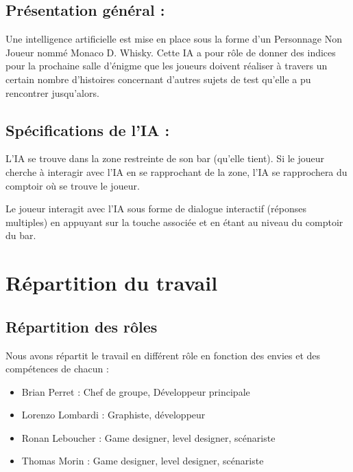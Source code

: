\documentclass[a4paper,11pt]{article}
\begin{document}
\subsection{Présentation général :}

Une intelligence artificielle est mise en place sous la 
forme d’un Personnage Non Joueur nommé Monaco D. Whisky. 
Cette IA a pour rôle de donner des indices pour la prochaine salle d’énigme que les 
joueurs doivent réaliser à travers un certain nombre d’histoires concernant d’autres sujets de 
test qu’elle a pu rencontrer jusqu’alors.


\subsection{Spécifications de l’IA :}

L’IA se trouve dans la zone restreinte de son bar (qu’elle tient). Si le joueur cherche à 
interagir avec l’IA en se rapprochant de la zone, l’IA se rapprochera du comptoir où se trouve le joueur.\newline


Le joueur interagit avec l’IA sous forme de dialogue interactif (réponses multiples) 
en appuyant sur la touche associée et en étant au niveau du comptoir du bar.


\section{Répartition du travail}

\subsection{Répartition des rôles}

Nous avons répartit le travail en différent rôle en fonction des envies 
et des compétences de chacun :\newline

\begin{itemize}
    \item Brian Perret : Chef de groupe, Développeur principale 
    \item Lorenzo Lombardi : Graphiste, développeur
    \item Ronan Leboucher : Game designer, level designer, scénariste
    \item Thomas Morin : Game designer, level designer, scénariste
\end{itemize}

\break
\end{document}
